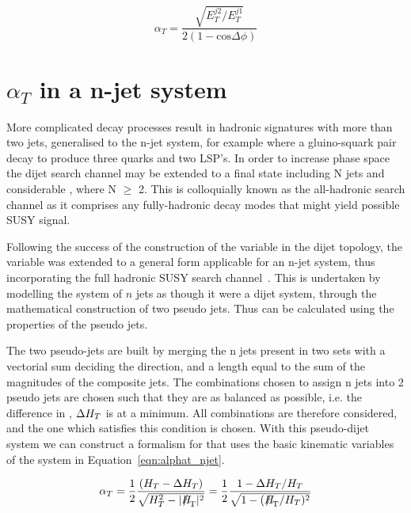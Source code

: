 \begin{equation}
\alpha_{T} = \frac{\sqrt{E_{T}^{j2}/E_{T}^{j1}}}{2(1- \textrm{cos} \Delta \phi)} 
\label{eqn:alphatphi}
\end{equation}


\section{$\alpha_{T}$ in a n-jet system}
More complicated decay processes result in hadronic signatures with more than two jets, generalised to the n-jet system, for example where a gluino-squark pair decay to produce three quarks and two LSP's. In order to increase phase space the dijet search channel may be extended to a final state including N jets and considerable \met, where N $\geq$ 2. This is colloquially known as the all-hadronic search channel as it comprises any fully-hadronic decay modes that might yield possible SUSY signal. 

Following the success of the construction of the \alt variable in the dijet topology, the variable was extended to a general form applicable for an n-jet system, thus incorporating the full hadronic SUSY search channel~\cite{ANnaT}. This is undertaken by modelling the system of $n$ jets as though it were a dijet system, through the mathematical construction of two pseudo jets. Thus \alt can be calculated using the properties of the pseudo jets. 

The two pseudo-jets are built by merging the n jets present in two sets with a vectorial sum deciding the direction, and a length equal to the sum of the magnitudes of the composite jets. The combinations chosen to assign n jets into 2 pseudo jets are chosen such that they are as balanced as possible, i.e. the difference in \HT, $\Delta H_{T} $ is at a minimum. All combinations are therefore considered, and the one which satisfies this condition is chosen. With this pseudo-dijet system we can construct a formalism for \alt that uses the basic kinematic variables of the system in Equation~\ref{eqn:alphat_njet}. 

\begin{equation}
\alpha_{T} =\frac{1}{2} \frac{(\HT - \Delta \HT)}{\sqrt{\HT^{2} - |\mht|^{2}}}  = \frac{1}{2} \frac{1-\Delta \HT / \HT}{\sqrt{1 - (\mht / \HT)^{2}}}
\label{eqn:alphat_njet}
\end{equation}

